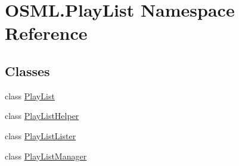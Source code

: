 \hypertarget{namespaceOSML_1_1PlayList}{}\section{O\+S\+M\+L.\+Play\+List Namespace Reference}
\label{namespaceOSML_1_1PlayList}
\subsection*{Classes}
\begin{DoxyCompactItemize}
\item 
class \mbox{\hyperlink{classOSML_1_1PlayList_1_1PlayList}{Play\+List}}
\item 
class \mbox{\hyperlink{classOSML_1_1PlayList_1_1PlayListHelper}{Play\+List\+Helper}}
\item 
class \mbox{\hyperlink{classOSML_1_1PlayList_1_1PlayListLister}{Play\+List\+Lister}}
\item 
class \mbox{\hyperlink{classOSML_1_1PlayList_1_1PlayListManager}{Play\+List\+Manager}}
\end{DoxyCompactItemize}
